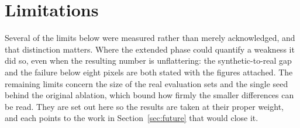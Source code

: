 \section{Limitations}

Several of the limits below were measured rather than merely acknowledged, and
that distinction matters. Where the extended phase could quantify a weakness it
did so, even when the resulting number is unflattering: the synthetic-to-real
gap and the failure below eight pixels are both stated with the figures attached.
The remaining limits concern the size of the real evaluation sets and the single
seed behind the original ablation, which bound how firmly the smaller
differences can be read. They are set out here so the results are taken at their
proper weight, and each points to the work in Section~\ref{sec:future} that would
close it.

